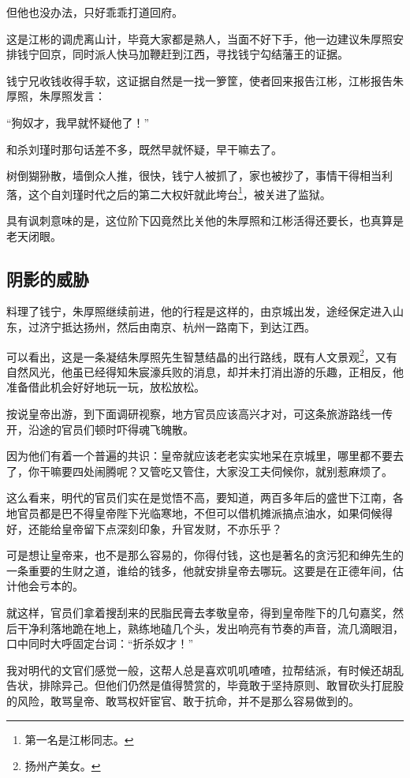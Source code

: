 \begin{multicols}{\theparacolNo}
但他也没办法，只好乖乖打道回府。

这是江彬的调虎离山计，毕竟大家都是熟人，当面不好下手，他一边建议朱厚照安排钱宁回京，同时派人快马加鞭赶到江西，寻找钱宁勾结藩王的证据。

钱宁兄收钱收得手软，这证据自然是一找一箩筐，使者回来报告江彬，江彬报告朱厚照，朱厚照发言：

“狗奴才，我早就怀疑他了！”

和杀刘瑾时那句话差不多，既然早就怀疑，早干嘛去了。

树倒猢狲散，墙倒众人推，很快，钱宁人被抓了，家也被抄了，事情干得相当利落，这个自刘瑾时代之后的第二大权奸就此垮台\footnote{第一名是江彬同志。}，被关进了监狱。

具有讽刺意味的是，这位阶下囚竟然比关他的朱厚照和江彬活得还要长，也真算是老天闭眼。

\subsection{阴影的威胁}
料理了钱宁，朱厚照继续前进，他的行程是这样的，由京城出发，途经保定进入山东，过济宁抵达扬州，然后由南京、杭州一路南下，到达江西。

可以看出，这是一条凝结朱厚照先生智慧结晶的出行路线，既有人文景观\footnote{扬州产美女。}，又有自然风光，他虽已经得知朱宸濠兵败的消息，却并未打消出游的乐趣，正相反，他准备借此机会好好地玩一玩，放松放松。

按说皇帝出游，到下面调研视察，地方官员应该高兴才对，可这条旅游路线一传开，沿途的官员们顿时吓得魂飞魄散。

因为他们有着一个普遍的共识：皇帝就应该老老实实地呆在京城里，哪里都不要去了，你干嘛要四处闹腾呢？又管吃又管住，大家没工夫伺候你，就别惹麻烦了。

这么看来，明代的官员们实在是觉悟不高，要知道，两百多年后的盛世下江南，各地官员都是巴不得皇帝陛下光临寒地，不但可以借机摊派搞点油水，如果伺候得好，还能给皇帝留下点深刻印象，升官发财，不亦乐乎？

可是想让皇帝来，也不是那么容易的，你得付钱，这也是著名的贪污犯和绅先生的一条重要的生财之道，谁给的钱多，他就安排皇帝去哪玩。这要是在正德年间，估计他会亏本的。

就这样，官员们拿着搜刮来的民脂民膏去孝敬皇帝，得到皇帝陛下的几句嘉奖，然后干净利落地跪在地上，熟练地磕几个头，发出响亮有节奏的声音，流几滴眼泪，口中同时大呼固定台词：“折杀奴才！”

我对明代的文官们感觉一般，这帮人总是喜欢叽叽喳喳，拉帮结派，有时候还胡乱告状，排除异己。但他们仍然是值得赞赏的，毕竟敢于坚持原则、敢冒砍头打屁股的风险，敢骂皇帝、敢骂权奸宦官、敢于抗命，并不是那么容易做到的。


\end{multicols}
